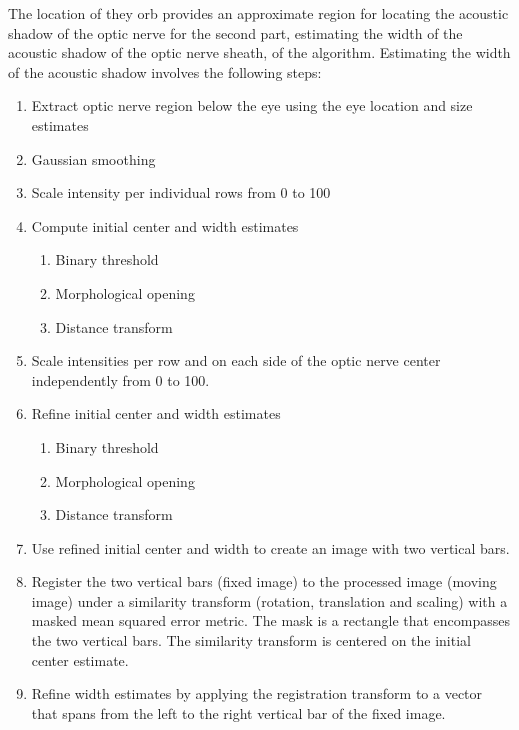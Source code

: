 \documentclass{llncs}
\begin{document}
The location of they orb provides an approximate region for locating the
acoustic shadow of the optic nerve for the second part, estimating the width of
the acoustic shadow of the optic nerve sheath, of the algorithm. Estimating the
width of the acoustic shadow involves the following steps:
\begin{enumerate}
\item Extract optic nerve region below the eye using the eye location and size estimates
\item Gaussian smoothing
\item Scale intensity per individual rows from 0 to 100
\item Compute initial center and width estimates
  \begin{enumerate}
  \item Binary threshold
  \item Morphological opening
  \item Distance transform
  \end{enumerate}
\item Scale intensities per row and on each side of the optic nerve center
      independently from 0 to 100.
\item Refine initial center and width estimates
  \begin{enumerate}
  \item Binary threshold
  \item Morphological opening
  \item Distance transform
  \end{enumerate}
\item Use refined initial center and width to create an image with two vertical bars. 
\item Register the two vertical bars (fixed image) to the processed image (moving
      image) under a similarity transform (rotation, translation and scaling)
      with a masked mean squared error metric. The mask is a rectangle that
      encompasses the two vertical bars. The similarity transform is centered on
      the initial  center estimate.
\item Refine width estimates by applying the registration transform to a vector
      that spans from the left to the right vertical bar of the fixed image.
\end{enumerate}
\end{document}
